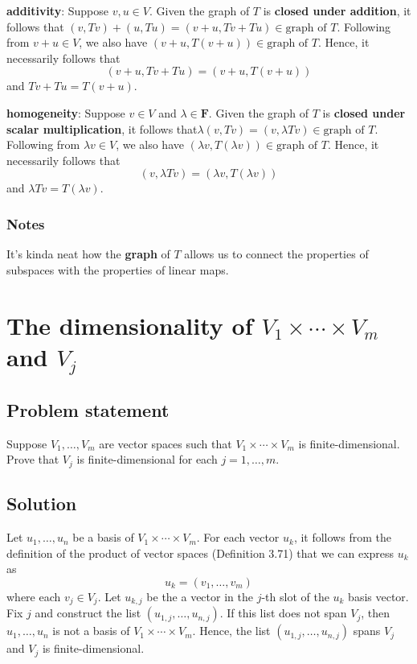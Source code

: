 \documentclass{article}
\begin{document}
\textbf{additivity}: Suppose $v,u\in V$. 
Given the graph of $T$ is \textbf{closed under addition}, it follows that $(v,Tv)+(u,Tu)=(v+u,Tv+Tu)\in \text{graph of }T$. 
Following from $v+u\in V$, we also have $(v+u,T(v+u))\in \text{graph of }T$. 
Hence, it necessarily follows that
\[(v+u,Tv+Tu)=(v+u,T(v+u))\]
and $Tv+Tu=T(v+u)$.

\textbf{homogeneity}: Suppose $v\in V$ and $\lambda\in \textbf{F}$. 
Given the graph of $T$ is \textbf{closed under scalar multiplication}, it follows that\newline $\lambda(v,Tv)=(v,\lambda Tv)\in \text{graph of }T$. 
Following from $\lambda v\in V$, we also have $(\lambda v,T(\lambda v))\in \text{graph of }T$. 
Hence, it necessarily follows that
\[(v,\lambda Tv)=(\lambda v,T(\lambda v))\]
and $\lambda Tv=T(\lambda v)$.

\subsubsection*{Notes}
It's kinda neat how the \textbf{graph} of $T$ allows us to connect the properties of subspaces with the properties of linear maps.

\clearpage

\section{The dimensionality of $V_1\times\cdots\times V_m$ and $V_j$}
\subsection*{Problem statement}
Suppose $V_1,\ldots,V_m$ are vector spaces such that $V_1\times\cdots\times V_m$ is finite-dimensional. 
Prove that $V_j$ is finite-dimensional for each $j=1,\ldots,m$.

\subsection*{Solution}
Let $u_1,\ldots,u_n$ be a basis of $V_1\times\cdots\times V_m$. 
For each vector $u_k$, it follows from the definition of the product of vector spaces (Definition 3.71) that we can express $u_k$ as
\[u_k=(v_1,\ldots,v_m)\]
where each $v_j\in V_j$. 
Let $u_{k,j}$ be the a vector in the $j$-th slot of the $u_k$ basis vector. 
Fix $j$ and construct the list $(u_{1,j},\ldots,u_{n,j})$. 
If this list does not span $V_j$, then $u_1,\ldots,u_n$ is not a basis of $V_1\times\cdots\times V_m$. 
Hence, the list $(u_{1,j},\ldots,u_{n,j})$ spans $V_j$ and $V_j$ is finite-dimensional.
\end{document}
